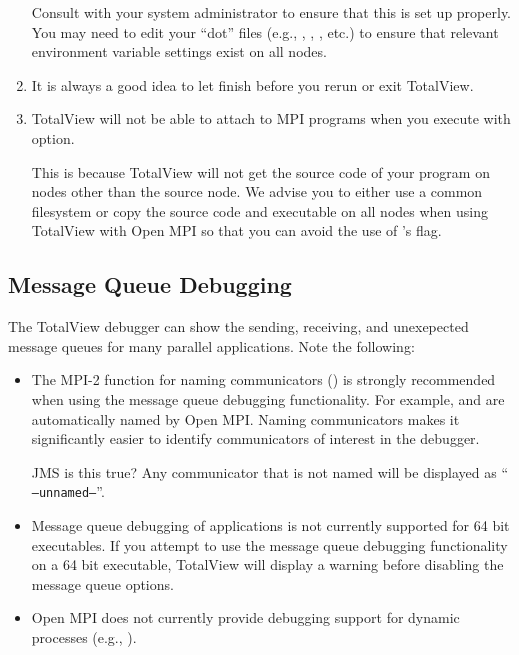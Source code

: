 \begin{enumerate}
  Consult with your system administrator to ensure that this is set up
  properly.  You may need to edit your ``dot'' files (e.g.,
  , , , etc.) to ensure that
  relevant environment variable settings exist on all nodes.
  
\item It is always a good idea to let  finish before you
  rerun or exit TotalView.
  
\item TotalView will not be able to attach to MPI programs when you
  execute  with  option.  
  
  This is because TotalView will not get the source code of your
  program on nodes other than the source node.  We advise you to
  either use a common filesystem or copy the source code and
  executable on all nodes when using TotalView with Open MPI so that you
  can avoid the use of 's  flag.
\end{enumerate}


\subsection{Message Queue Debugging}

The TotalView debugger can show the sending, receiving, and
unexepected message queues for many parallel applications.  Note the
following:

\begin{itemize}
\item The MPI-2 function for naming communicators
  () is strongly recommended when
  using the message queue debugging functionality.  For example,
   and 
  are automatically named by Open MPI.  Naming communicators makes it
  significantly easier to identify communicators of interest in the
  debugger.

  {\Huge JMS is this true?}
  Any communicator that is not named will be displayed as ``{\tt
  --unnamed--}''.

\item Message queue debugging of applications is not currently
  supported for 64 bit executables.  If you attempt to use the message
  queue debugging functionality on a 64 bit executable, TotalView will
  display a warning before disabling the message queue options.
  
\item Open MPI does not currently provide debugging support for
  dynamic processes (e.g., ).
\end{itemize}

